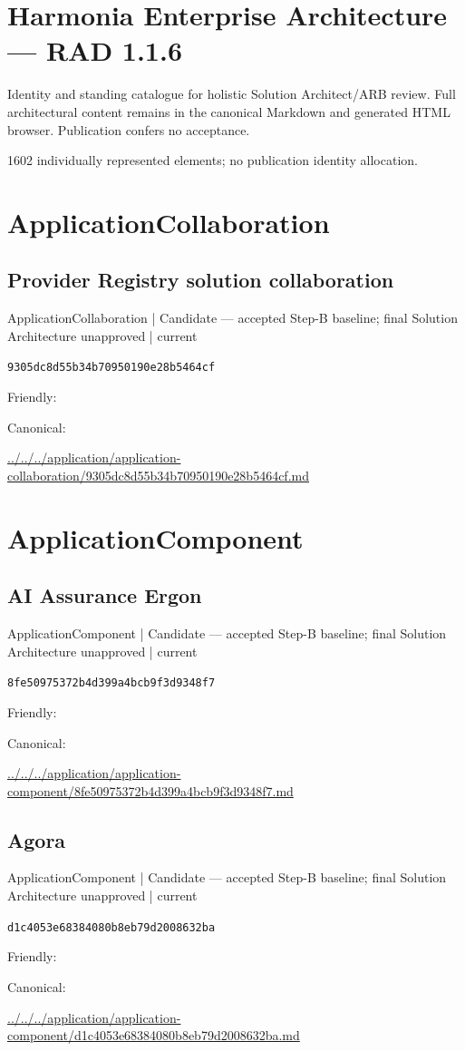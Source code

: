 \documentclass[10pt,a4paper]{article}
\begin{document}
\section*{Harmonia Enterprise Architecture — RAD 1.1.6}
Identity and standing catalogue for holistic Solution Architect/ARB review. Full architectural content remains in the canonical Markdown and generated HTML browser. Publication confers no acceptance.\par
1602 individually represented elements; no publication identity allocation.\par
\section*{ApplicationCollaboration}
\subsection*{Provider Registry solution collaboration}
{\small ApplicationCollaboration | Candidate — accepted Step-B baseline; final Solution Architecture unapproved | current}\par
\texttt{9305dc8d55b34b70950190e28b5464cf}\par
Friendly: \par
Canonical: \par
{\footnotesize\url{../../../application/application-collaboration/9305dc8d55b34b70950190e28b5464cf.md}}\par
\section*{ApplicationComponent}
\subsection*{AI Assurance Ergon}
{\small ApplicationComponent | Candidate — accepted Step-B baseline; final Solution Architecture unapproved | current}\par
\texttt{8fe50975372b4d399a4bcb9f3d9348f7}\par
Friendly: \par
Canonical: \par
{\footnotesize\url{../../../application/application-component/8fe50975372b4d399a4bcb9f3d9348f7.md}}\par
\subsection*{Agora}
{\small ApplicationComponent | Candidate — accepted Step-B baseline; final Solution Architecture unapproved | current}\par
\texttt{d1c4053e68384080b8eb79d2008632ba}\par
Friendly: \par
Canonical: \par
{\footnotesize\url{../../../application/application-component/d1c4053e68384080b8eb79d2008632ba.md}}\par
\end{document}
